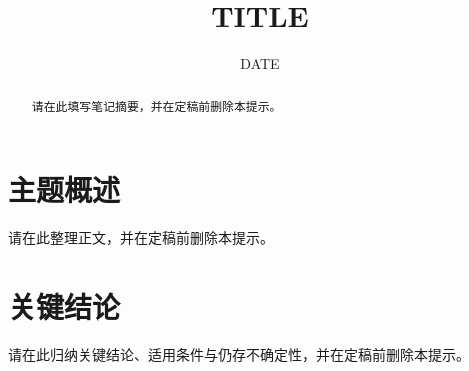\documentclass[cn,hazy,blue,12pt,normal]{elegantnote}
\title{{{TITLE}}}
\author{}
\date{{{DATE}}}
\begin{document}
\maketitle

\begin{abstract}
请在此填写笔记摘要，并在定稿前删除本提示。
\end{abstract}

\section{主题概述}

请在此整理正文，并在定稿前删除本提示。

\section{关键结论}

请在此归纳关键结论、适用条件与仍存不确定性，并在定稿前删除本提示。
\end{document}
